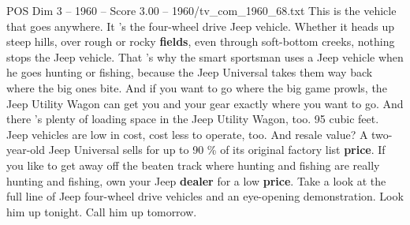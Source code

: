 \begin{textsample}{POS Dim 3 – 1960 – Score 3.00 – 1960/tv\_com\_1960\_68.txt}  \label{ex:f3_pos_026}
This is the vehicle that goes anywhere.
It 's the four-wheel drive Jeep vehicle.
Whether it heads up steep hills, over rough or rocky \textbf{fields}, even through soft-bottom creeks, nothing stops the Jeep vehicle.
That 's why the smart sportsman uses a Jeep vehicle when he goes hunting or fishing, because the Jeep Universal takes them way back where the big ones bite.
And if you want to go where the big game prowls, the Jeep Utility Wagon can get you and your gear exactly where you want to go.
And there 's plenty of loading space in the Jeep Utility Wagon, too. 95 cubic feet.
Jeep vehicles are low in cost, cost less to operate, too.
And resale value?
A two-year-old Jeep Universal sells for up to 90 \% of its original factory list \textbf{price}.
If you like to get away off the beaten track where hunting and fishing are really hunting and fishing, own your Jeep \textbf{dealer} for a low \textbf{price}.
Take a look at the full line of Jeep four-wheel drive vehicles and an eye-opening demonstration.
Look him up tonight.
Call him up tomorrow.

\end{textsample}
